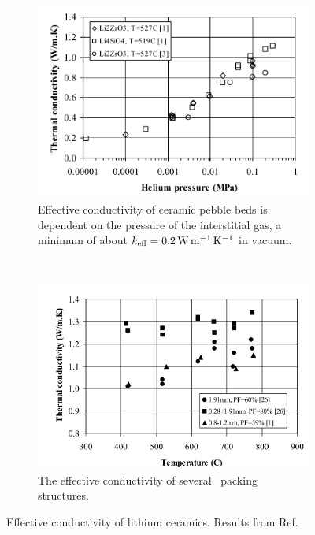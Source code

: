 \begin{figure}[ht]
        \centering
        \begin{subfigure}[t]{\doubleimagewidth}
                \includegraphics[width=\textwidth]{figures/keff-pressure}
                \caption{Effective conductivity of ceramic pebble beds is dependent on the pressure of the interstitial gas, a minimum of about $k_\text{eff} = \SI{0.2}{\watt\per\meter\per\kelvin}$ in vacuum.}
                \label{fig:keff-pressure}
        \end{subfigure}%
        ~
        \begin{subfigure}[t]{\doubleimagewidth  }
                \includegraphics[width=\textwidth]{figures/lit-keff-exp}
                \caption{The effective conductivity of several \lit~packing structures.}
                \label{fig:keff-lit}
        \end{subfigure}
        \caption{Effective conductivity of lithium ceramics. Results from Ref.~\cite{Abou-Sena2005}}\label{fig:keff}
\end{figure}

